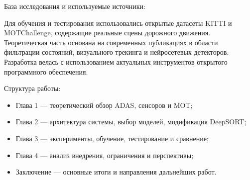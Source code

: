 База исследования и используемые источники:

Для обучения и тестирования использовались открытые датасеты KITTI и MOTChallenge, содержащие реальные сцены дорожного движения. Теоретическая часть основана на современных публикациях в области фильтрации состояний, визуального трекинга и нейросетевых детекторов. Разработка велась с использованием актуальных инструментов открытого программного обеспечения.

Структура работы:
\begin{itemize}
    \item Глава 1 — теоретический обзор ADAS, сенсоров и MOT;
    \item Глава 2 — архитектура системы, выбор моделей, модификация DeepSORT;
    \item Глава 3 — эксперименты, обучение, тестирование и сравнение;
    \item Глава 4 — анализ внедрения, ограничения и перспективы;
    \item Заключение — основные итоги и направления дальнейших работ.
\end{itemize}

